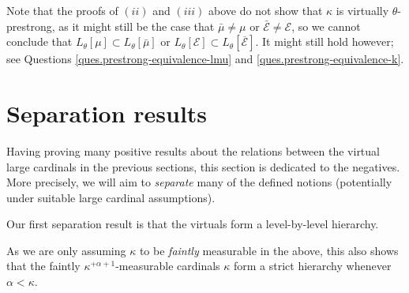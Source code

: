 \documentclass[../../main]{subfiles}
\begin{document}
Note that the proofs of $(ii)$ and $(iii)$ above do not show that $\kappa$ is virtually $\theta$-prestrong, as it might still be the case that $\bar\mu\neq\mu$ or $\bar{\mathcal E}\neq\mathcal E$, so we cannot conclude that $L_\theta[\mu]\subset L_\theta[\bar\mu]$ or $L_\theta[\mathcal E]\subset L_\theta[\overline{\mathcal E}]$. It might still hold however; see Questions \ref{ques.prestrong-equivalence-lmu} and \ref{ques.prestrong-equivalence-k}.


\section{Separation results}

Having proving many positive results about the relations between the virtual large cardinals in the previous sections, this section is dedicated to the negatives. More precisely, we will aim to \textit{separate} many of the defined notions (potentially under suitable large cardinal assumptions).

\qquad Our first separation result is that the virtuals form a level-by-level hierarchy.


As we are only assuming $\kappa$ to be \textit{faintly} measurable in the above, this also shows that the faintly $\kappa^{+\alpha+1}$-measurable cardinals $\kappa$ form a strict hierarchy whenever $\alpha<\kappa$.
\end{document}

